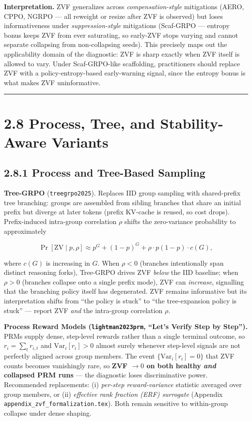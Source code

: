 \documentclass[
  american,
  11pt,
  a4paper,
  oneside]{report}
\begin{document}
\textbf{Interpretation.} ZVF generalizes across
\emph{compensation-style} mitigations (AERO, CPPO, NGRPO --- all
reweight or resize after ZVF is observed) but loses informativeness
under \emph{suppression-style} mitigations (Scaf-GRPO --- entropy bonus
keeps ZVF from ever saturating, so early-ZVF stops varying and cannot
separate collapsing from non-collapsing seeds). This precisely maps out
the applicability domain of the diagnostic: ZVF is sharp exactly when
ZVF itself is allowed to vary. Under Scaf-GRPO-like scaffolding,
practitioners should replace ZVF with a policy-entropy-based
early-warning signal, since the entropy bonus is what makes ZVF
uninformative.

\begin{center}\rule{0.5\linewidth}{0.5pt}\end{center}

\section{2.8 Process, Tree, and Stability-Aware
Variants}\label{process-tree-and-stability-aware-variants}

\subsection{2.8.1 Process and Tree-Based
Sampling}\label{process-and-tree-based-sampling}

\textbf{Tree-GRPO} (\texttt{treegrpo2025}). Replaces IID group sampling
with shared-prefix tree branching: groups are assembled from sibling
branches that share an initial prefix but diverge at later tokens
(prefix KV-cache is reused, so cost drops). Prefix-induced intra-group
correlation \(\rho\) shifts the zero-variance probability to
approximately

\[\Pr[\mathrm{ZV} \mid p, \rho] \approx p^G + (1-p)^G + \rho \cdot p(1-p) \cdot c(G),\]

where \(c(G)\) is increasing in \(G\). When \(\rho < 0\) (branches
intentionally span distinct reasoning forks), Tree-GRPO drives ZVF
\emph{below} the IID baseline; when \(\rho > 0\) (branches collapse onto
a single prefix mode), ZVF can \emph{increase}, signalling that the
branching policy itself has degenerated. ZVF remains informative but its
interpretation shifts from ``the policy is stuck'' to ``the
tree-expansion policy is stuck'' --- report ZVF \emph{and} the
intra-group correlation \(\rho\).

\textbf{Process Reward Models (\texttt{lightman2023prm}, ``Let's Verify
Step by Step'').} PRMs supply dense, step-level rewards rather than a
single terminal outcome, so \(r_i = \sum_t r_{i,t}\) and
\(\mathrm{Var}_i[r_i] > 0\) almost surely whenever step-level signals
are not perfectly aligned across group members. The event
\(\{\mathrm{Var}_i[r_i] = 0\}\) that ZVF counts becomes vanishingly
rare, so \textbf{ZVF \(\to 0\) on both healthy \emph{and} collapsed PRM
runs} --- the diagnostic loses discriminative power. Recommended
replacements: (i) \emph{per-step reward-variance} statistic averaged
over group members, or (ii) \emph{effective rank fraction (ERF)
surrogate} (Appendix \texttt{appendix\_zvf\_formalization.tex}). Both
remain sensitive to within-group collapse under dense shaping.
\end{document}
